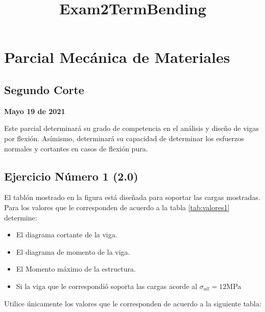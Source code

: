 \documentclass[11pt]{article}
\title{Exam2TermBending}
\providecommand{\tightlist}{%
      \setlength{\itemsep}{0pt}\setlength{\parskip}{0pt}}
\begin{document}
    
    \maketitle
    
    

    
    \hypertarget{parcial-mecuxe1nica-de-materiales}{%
\section{Parcial Mecánica de
Materiales}\label{parcial-mecuxe1nica-de-materiales}}

\hypertarget{segundo-corte}{%
\subsection{Segundo Corte}\label{segundo-corte}}

\textbf{Mayo 19 de 2021}

Este parcial determinará su grado de competencia en el análisis y diseño
de vigas por flexión. Asímismo, determinará su capacidad de determinar
los esfuerzos normales y cortantes en casos de flexión pura.

\hypertarget{ejercicio-nuxfamero-1-2.0}{%
\subsection{Ejercicio Número 1 (2.0)}\label{ejercicio-nuxfamero-1-2.0}}

El tablón mostrado en la figura está diseñada para soportar las cargas
mostradas. Para los valores que le corresponden de acuerdo a la tabla
\ref{tab:valores1} determine:

\begin{itemize}
\tightlist
\item
  El diagrama cortante de la viga.
\item
  El diagrama de momento de la viga.
\item
  El Momento máximo de la estructura.
\item
  Si la viga que le correspondió soporta las cargas acorde al
  \(\sigma_{all}=12\)MPa
\end{itemize}

Utilice únicamente los valores que le corresponden de acuerdo a la
siguiente tabla:
\end{document}
